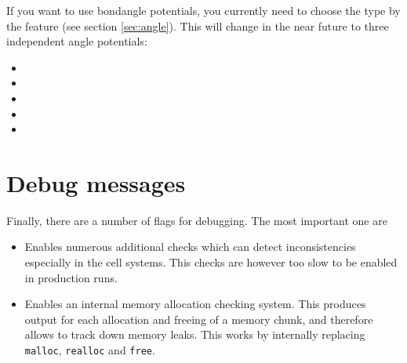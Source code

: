 If you want to use bondangle potentials, you currently need to choose
the type by the feature (see section \vref{sec:angle}). This will
change in the near future to three independent angle potentials:
\begin{itemize}
\item {}
\item {}
\item {}
\item {}
\item {}
\end{itemize}

\section{Debug messages}

Finally, there are a number of flags for debugging. The most important
one are
\begin{itemize}
\item {} Enables numerous additional checks
  which can detect inconsistencies especially in the cell systems.
  This checks are however too slow to be enabled in production runs.
\item {} Enables an internal memory allocation
  checking system. This produces output for each allocation and
  freeing of a memory chunk, and therefore allows to track down memory
  leaks. This works by internally replacing \texttt{malloc},
  \texttt{realloc} and \texttt{free}.
\end{itemize}

